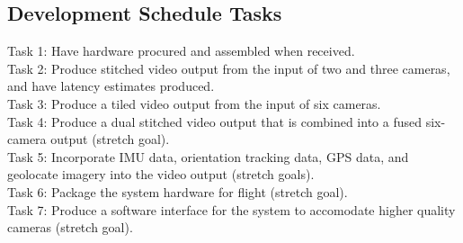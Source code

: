\documentclass[letterpaper,10pt,serif,draftclsnofoot,onecolumn,compsoc,titlepage]{IEEEtran}
\begin{document}
\subsection{Development Schedule Tasks}
Task 1: Have hardware procured and assembled when received.\\
Task 2: Produce stitched video output from the input of two and three cameras, 
and have latency estimates produced.\\
Task 3: Produce a tiled video output from the input of six cameras.\\
Task 4: Produce a dual stitched video output that is combined into a fused 
six-camera output (stretch goal).\\
Task 5: Incorporate IMU data, orientation tracking data, GPS data, and 
geolocate imagery into the video output (stretch goals).\\
Task 6: Package the system hardware for flight (stretch goal).\\
Task 7: Produce a software interface for the system to accomodate higher 
quality cameras (stretch goal).\\
\end{document}
